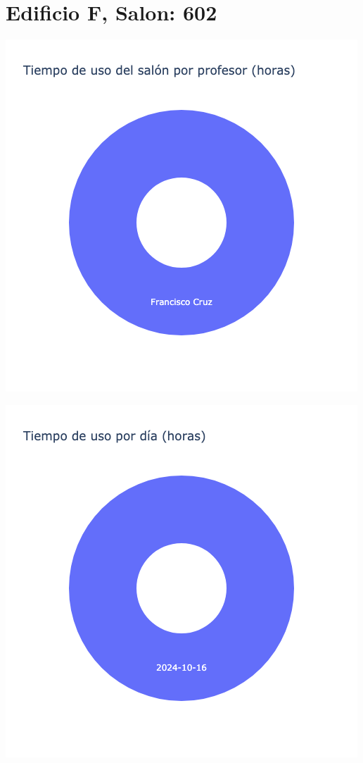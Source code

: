 \documentclass{article}
\begin{document}
    \section{Edificio F, Salon: 602}
    \noindent
    \begin{minipage}{0.48\textwidth}
        \centering
        \includegraphics[width=\textwidth]{../img/pie/UP602-90Dias-03-12-2024.png}
    \end{minipage}
    \hfill
    \begin{minipage}{0.48\textwidth}
        \centering
        \includegraphics[width=\textwidth]{../img/pie/UD602-90Dias-03-12-2024.png}
    \end{minipage}
    
\end{document}

